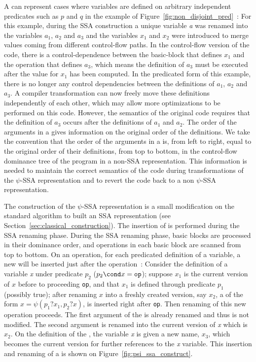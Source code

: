 A \psifun can represent cases where variables are defined on arbitrary independent
predicates such as $p$ and $q$ in the example of Figure~\ref{fig:non_disjoint_pred}~: For this example, during the SSA
construction a unique variable \textit{a} was renamed into the variables
${a_1}$, ${a_2}$ and ${a_3}$ and the variables ${x_1}$
and ${x_2}$ were introduced to merge values coming from different
control-flow paths. In the control-flow version of the code, there is a
control-dependence between the basic-block that defines ${x_1}$ and the operation that defines ${a_3}$, which means
the definition of ${a_3}$ must be executed after the value for
${x_1}$ has been computed. In the predicated form of this example,
there is no longer any control dependencies between the definitions of
${a_1}$, ${a_2}$ and ${a_3}$. A compiler transformation
can now freely move these definitions independently of each other,
which may allow more optimizations to be performed on this
code. However, the semantics of the original code requires that the
definition of ${a_3}$ occurs after the definitions of ${a_1}$
and ${a_2}$. The order of the arguments in a \psifun gives
information on the original order of the definitions. We take the
convention that the order of the arguments in a \psifun is,
from left to right, equal to the original order of their definitions,
from top to bottom, in the control-flow dominance tree of the program
in a non-SSA representation. This information is needed to maintain
the correct semantics of the code during transformations of the
$\psi$-SSA representation and to revert the code back to a non
$\psi$-SSA representation.


The construction of the $\psi$-SSA representation is a small
modification on the standard algorithm to built an SSA representation (see Section~\ref{sec:classical_construction}).
%
The insertion of \psifuns is performed during the SSA renaming
phase.
%
During the SSA renaming phase, basic blocks are processed in their
dominance order, and operations in each basic block are scanned from
top to bottom. On an operation, for each predicated definition of a
variable, a new \psifun will be inserted just after the
operation~: Consider the definition of a variable \textit{x} under predicate
${p_2}$ ($p_2\cond x= \texttt{op}$); suppose ${x_1}$ is the current version of $x$ before
to proceeding \texttt{op}, and that $x_1$ is defined through predicate $p_1$ (possibly true); after renaming $x$ into a freshly created version, say $x_2$, a \psifun of the form ${x = \psi(p_1?x_1,
  p_2?x)}$, is inserted right after \texttt{op}. 
Then renaming of this new operation proceeds. The first argument of
the \psifun is already renamed and thus is not modified. The
second argument is renamed into the current version of \textit{x}
which is ${x_2}$. On the definition of the \psifun, the
variable \textit{x} is given a new name, ${x_3}$, which becomes the
current version for further references to the \textit{x} variable. This
insertion and renaming of a \psifun is shown on
Figure~\ref{fig:psi_ssa_construct}.

